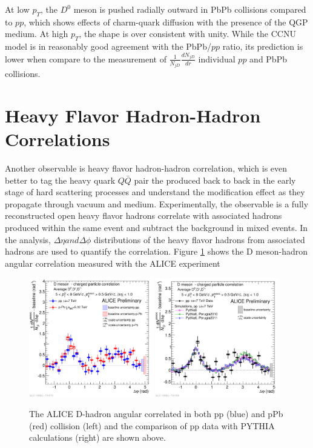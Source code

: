 At low $p_T$, the $D^0$ meson is pushed radially outward in PbPb collisions compared to $pp$, which shows effects of charm-quark diffusion with the presence of the QGP medium. At high $p_T$, the shape is over consistent with unity. While the CCNU model is in reasonably good agreement with the PbPb/$pp$ ratio, its prediction is lower when compare to the measurement of $\frac{1}{N_{jD}}\frac{dN_{jD}}{dr}$ individual $pp$ and PbPb collisions.


\section{Heavy Flavor Hadron-Hadron Correlations}

Another observable is heavy flavor hadron-hadron correlation, which is even better to tag the heavy quark $Q\bar Q$ pair the produced back to back in the early stage of hard scattering processes and understand the modification effect as they propagate through vacuum and medium. Experimentally, the observable is a fully reconstructed open heavy flavor hadrons correlate with associated hadrons produced within the same event and subtract the background in mixed events. In the analysis, $\Delta \eta and \Delta \phi$ distributions of the heavy flavor hadrons from associated hadrons are used to quantify the correlation. Figure \ref{ALICEDHadron} shows the D meson-hadron angular correlation measured with the ALICE experiment \cite{DHadronRef}


\begin{figure}[hbtp]
\begin{center}
\includegraphics[width=0.48\textwidth]{Figures/Chapter2/ALICEDHadron.png}
\includegraphics[width=0.48\textwidth]{Figures/Chapter2/ALICEDHadronPP.png}
\caption{The ALICE D-hadron angular correlated in both pp (blue) and pPb (red) collision (left) and the comparison of pp data with PYTHIA calculations (right) are shown above.}
\label{ALICEDHadron}
\end{center}
\end{figure}   

